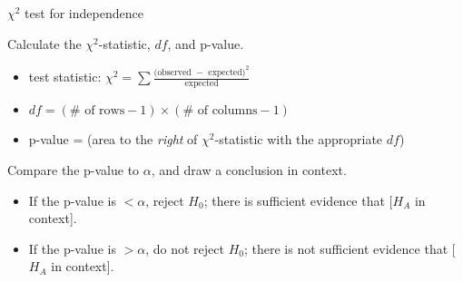 \begin{onebox}{$\chi^2$ test for independence}
\begin{itemize}
\end{itemize}
 Calculate the $\chi^2$-statistic, $df$, and p-value.\vspace{-1mm}  
\begin{itemize}
\setlength{\itemsep}{0mm}
\item[] test statistic:  $\chi^2 =\sum{ \frac{\text{(observed } - \text{ expected})^2}{\text{expected}}}$ 
\item[] $df = (\# \text{ of rows} - 1) \times (\# \text{ of columns} - 1)$
\item[] p-value = (area to the \emph{right} of $\chi^2$-statistic with the appropriate $df$)
\end{itemize}
 Compare the p-value to $\alpha$, and draw a conclusion in context.
\begin{itemize}\vspace{-1mm}
\setlength{\itemsep}{0mm}
\item[] If the p-value is $< \alpha$, reject $H_0$; there is sufficient evidence that [$H_A$ in context]. 
\item[] If the p-value is $> \alpha$, do not reject $H_0$; there is not sufficient evidence that [$H_A$ in context].
\end{itemize}\end{onebox}



